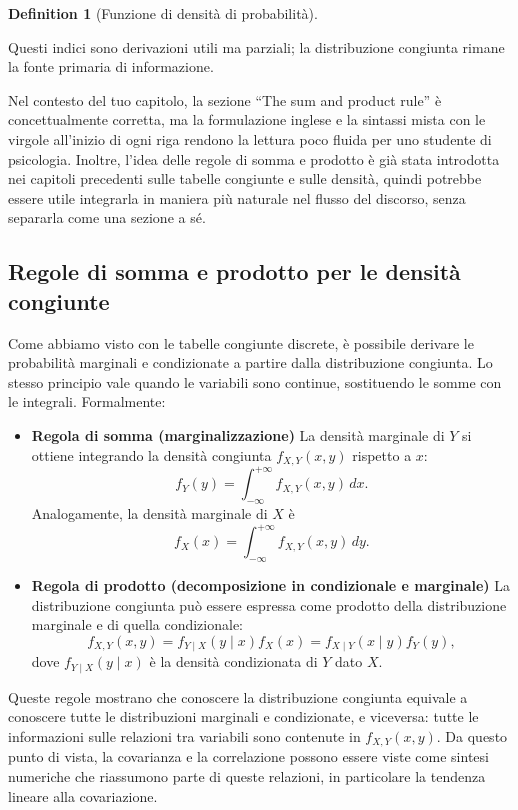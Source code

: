 \documentclass[
  letterpaper,
  DIV=11,
  numbers=noendperiod,
  oneside]{scrreprt}
\theoremstyle{definition}
\theoremstyle{plain}
\theoremstyle{definition}
\newtheorem{definition}{Definition}[chapter]
\theoremstyle{remark}
\begin{document}
\begin{definition}[Funzione di densità di
probabilità]
\begin{tcolorbox}
Questi indici sono derivazioni utili ma parziali; la distribuzione
congiunta rimane la fonte primaria di informazione.

\end{tcolorbox}

Nel contesto del tuo capitolo, la sezione ``The sum and product rule'' è
concettualmente corretta, ma la formulazione inglese e la sintassi mista
con le virgole all'inizio di ogni riga rendono la lettura poco fluida
per uno studente di psicologia. Inoltre, l'idea delle regole di somma e
prodotto è già stata introdotta nei capitoli precedenti sulle tabelle
congiunte e sulle densità, quindi potrebbe essere utile integrarla in
maniera più naturale nel flusso del discorso, senza separarla come una
sezione a sé.

\subsection{Regole di somma e prodotto per le densità
congiunte}\label{regole-di-somma-e-prodotto-per-le-densituxe0-congiunte}

Come abbiamo visto con le tabelle congiunte discrete, è possibile
derivare le probabilità marginali e condizionate a partire dalla
distribuzione congiunta. Lo stesso principio vale quando le variabili
sono continue, sostituendo le somme con le integrali. Formalmente:

\begin{itemize}
\item
  \textbf{Regola di somma (marginalizzazione)} La densità marginale di
  \(Y\) si ottiene integrando la densità congiunta \(f_{X,Y}(x,y)\)
  rispetto a \(x\): \[
  f_Y(y) = \int_{-\infty}^{+\infty} f_{X,Y}(x,y) \,dx.
  \] Analogamente, la densità marginale di \(X\) è \[
  f_X(x) = \int_{-\infty}^{+\infty} f_{X,Y}(x,y) \,dy.
  \]
\item
  \textbf{Regola di prodotto (decomposizione in condizionale e
  marginale)} La distribuzione congiunta può essere espressa come
  prodotto della distribuzione marginale e di quella condizionale: \[
  f_{X,Y}(x,y) = f_{Y \mid X}(y \mid x) f_X(x) = f_{X \mid Y}(x \mid y) f_Y(y),
  \] dove \(f_{Y \mid X}(y \mid x)\) è la densità condizionata di \(Y\)
  dato \(X\).
\end{itemize}

Queste regole mostrano che conoscere la distribuzione congiunta equivale
a conoscere tutte le distribuzioni marginali e condizionate, e
viceversa: tutte le informazioni sulle relazioni tra variabili sono
contenute in \(f_{X,Y}(x,y)\). Da questo punto di vista, la covarianza e
la correlazione possono essere viste come sintesi numeriche che
riassumono parte di queste relazioni, in particolare la tendenza lineare
alla covariazione.


\end{definition}
\end{document}
